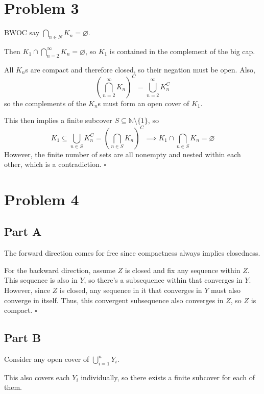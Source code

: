 \documentclass[12pt]{article}
\newcommand{\N}{\mathbb{N}}
\begin{document}
\pagebreak

\section{Problem 3}

BWOC say $\bigcap_{n \in N} K_n = \varnothing$.

Then $K_1 \cap \bigcap_{n=2}^\infty K_n = \varnothing$, so
$K_1$ is contained in the complement of the big cap.

All $K_n$s are compact and therefore closed, so their negation must be open.
Also,
\[\left(\bigcap_{n=2}^\infty K_n\right)^C=\bigcup_{n=2}^\infty K_n^C\]
so the complements of the $K_n$s must form an open cover of $K_1$.

This then implies a finite subcover $S \subseteq \N \setminus \{1\}$, so
\[K_1 \subseteq \bigcup_{n \in S} K_n^C = \left(\bigcap_{n \in S} K_n\right)^C
\implies K_1 \cap \bigcap_{n \in S} K_n = \varnothing\]
However, the finite number of sets are all nonempty and nested within each other,
which is a contradiction. $\square$

\pagebreak

\section{Problem 4}

\subsection{Part A}

The forward direction comes for free since compactness always implies closedness.

For the backward direction, assume $Z$ is closed and fix any sequence within $Z$.
This sequence is also in $Y$, so there's a subsequence within that converges in $Y$.
However, since $Z$ is closed, any sequence in it that converges in $Y$ must also converge in itself.
Thus, this convergent subsequence also converges in $Z$, so $Z$ is compact. $\square$

\subsection{Part B}

Consider any open cover of $\bigcup_{i=1}^n Y_i$.

This also covers each $Y_i$ individually, so there exists a finite subcover for each of them.
\end{document}
